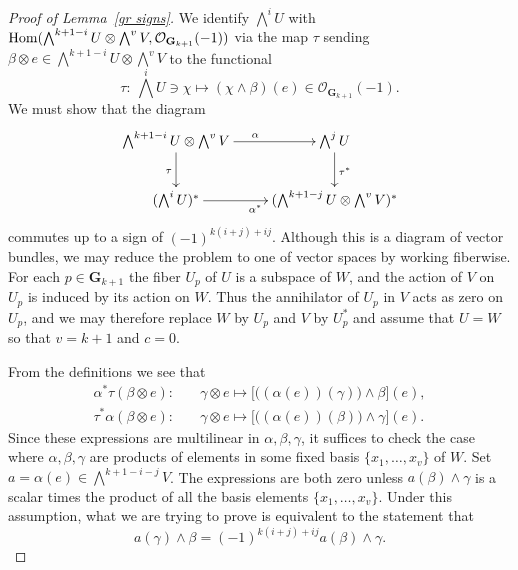\documentclass{jams-l}
\theoremstyle{definition}
\theoremstyle{remark}
\newcommand{\GG}{{\mathbf G}}
\newcommand{\Ocal}{{\mathcal O}}
\newcommand{\Hom}{{\mathop{\rm Hom}\nolimits}}
\begin{document}
\begin{proof}[Proof of Lemma~\ref{gr signs}]
We identify 
$\bigwedge^iU$ with $\Hom(\bigwedge^{k+1-i}U\otimes \bigwedge^vV,\Ocal_{\GG_{k+1}}(-1))$
via the map $\tau$ sending $\beta\otimes e\in \bigwedge^{k+1-i}U\otimes \bigwedge^vV$
to the functional
\[
\tau:\ \bigwedge^iU \ni\chi\mapsto (\chi\wedge\beta)(e)\in \Ocal_{\GG_{k+1}}(-1).
\]
We must show that the diagram
\[
\begin{xy}
\xymatrix{
\bigwedge^{k+1-i}U\otimes \bigwedge^vV\ar[r]^{\alpha}\ar[d]_{\tau} 
& \bigwedge^j U\ar[d]^{\tau^*}\\
(\bigwedge^i U)^* \ar[r]_{\alpha^*} &(\bigwedge^{k+1-j}U\otimes 
\bigwedge^vV)^*
}
\end{xy} 
\]
commutes up to a sign of $(-1)^{k(i+j)+ij}$. Although this
is a diagram of vector bundles, we may reduce the
problem to one of vector spaces by working fiberwise. 
For each $p\in \GG_{k+1}$ the
fiber $U_p$ of $U$ is a subspace of $W$, and
the action of $V$ on $U_p$ is induced by
its action on $W$. Thus the annihilator of $U_p$ in $V$ acts
as zero on $U_p$, and we may therefore replace $W$ by $U_p$
and $V$ by $U_p^*$ and assume that  $U=W$
so that $v=k+1$ and $c=0$.

From the definitions we see that 
\begin{align*}
\alpha^*\tau(\beta\otimes e):\quad &\gamma\otimes e \mapsto 
\bigl[\bigl((\alpha(e))(\gamma)\bigr)\wedge \beta\bigr](e), \\
\tau^*\alpha(\beta\otimes e):\quad &\gamma\otimes e \mapsto 
\bigl[\bigl((\alpha(e))(\beta)\bigr)\wedge\gamma\bigr](e).
\end{align*}
Since these expressions are multilinear in $\alpha, \beta, \gamma$,
it suffices to check the case where $\alpha, \beta, \gamma$ are
products of elements in some fixed basis 
$\{x_1,\dots,x_v\}$ of $W$.
Set
$a=\alpha(e)\in\bigwedge^{k+1-i-j}V$.
The expressions are both zero unless
$a(\beta)\wedge \gamma$ is a scalar times the product of 
all the basis elements $\{x_1,\dots,x_v\}$. Under this 
assumption, what we are trying to prove is equivalent
to the statement that
\[
a(\gamma)\wedge \beta = (-1)^{k(i+j)+ij} a(\beta)\wedge \gamma.
\]


\end{proof}
\end{document}
